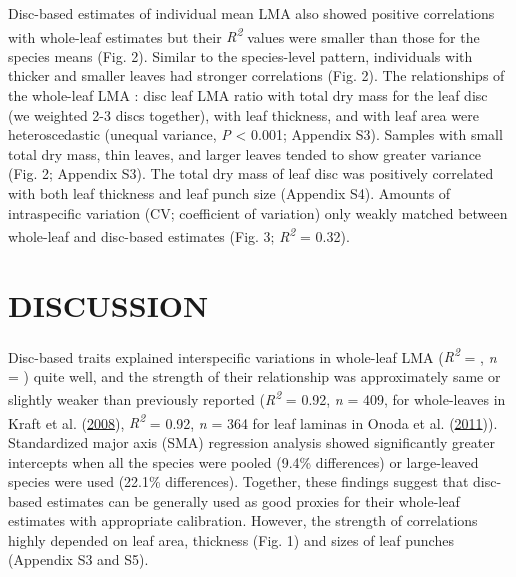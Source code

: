 \documentclass[
  12pt,
  a4paper,
,tablecaptionabove
]{scrartcl}
\begin{document}
Disc-based estimates of individual mean LMA also showed positive
correlations with whole-leaf estimates but their
\emph{R\textsuperscript{2}} values were smaller than those for the
species means (Fig. 2). Similar to the species-level pattern,
individuals with thicker and smaller leaves had stronger correlations
(Fig. 2). The relationships of the whole-leaf LMA : disc leaf LMA ratio
with total dry mass for the leaf disc (we weighted 2-3 discs together),
with leaf thickness, and with leaf area were heteroscedastic (unequal
variance, \emph{P} \textless{} 0.001; Appendix S3). Samples with small
total dry mass, thin leaves, and larger leaves tended to show greater
variance (Fig. 2; Appendix S3). The total dry mass of leaf disc was
positively correlated with both leaf thickness and leaf punch size
(Appendix S4). Amounts of intraspecific variation (CV; coefficient of
variation) only weakly matched between whole-leaf and disc-based
estimates (Fig. 3; \emph{R\textsuperscript{2}} = 0.32).

\hypertarget{discussion}{%
\section{DISCUSSION}\label{discussion}}

Disc-based traits explained interspecific variations in whole-leaf LMA
(\emph{R\textsuperscript{2}} = , \emph{n} = ) quite well, and the
strength of their relationship was approximately same or slightly weaker
than previously reported (\emph{R\textsuperscript{2}} = 0.92, \emph{n} =
409, for whole-leaves in Kraft et al.
(\protect\hyperlink{ref-Kraft2008}{2008}), \emph{R\textsuperscript{2}} =
0.92, \emph{n} = 364 for leaf laminas in Onoda et al.
(\protect\hyperlink{ref-Onoda2011}{2011})). Standardized major axis
(SMA) regression analysis showed significantly greater intercepts when
all the species were pooled (9.4\% differences) or large-leaved species
were used (22.1\% differences). Together, these findings suggest that
disc-based estimates can be generally used as good proxies for their
whole-leaf estimates with appropriate calibration. However, the strength
of correlations highly depended on leaf area, thickness (Fig. 1) and
sizes of leaf punches (Appendix S3 and S5).
\end{document}
